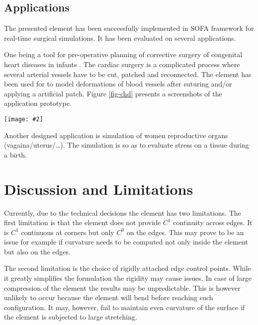 \documentclass{egpubl}
\newcommand{\FigureW}[3]{%
\begin{figure*}[htb]
  \centering
  \texttt{[image: \#2]}
  \caption{\label{fig-#2}#3}
\end{figure*}}
\begin{document}
\subsection{Applications}

The presented element has been successfully implemented in SOFA framework
\cite{Faure2012} for real-time surgical simulations. It has been evaluated
on several applications.

One being a tool for pre-operative planning of corrective surgery of
congenital heart diseases in infants \cite{Kislinskiy2012}. The cardiac
surgery is a complicated process where several arterial vessels have to be
cut, patched and reconnected. The element has been used for to model
deformations of blood vessels after suturing and/or applying a artificial
patch. Figure \ref{fig-chd} presents a screenshots of the application
prototype.

\FigureW{0.75\linewidth}{chd}
{Screenshots of the simulation system prototype for different surgical
procedures used to repair a coarctation of an aortic arch. The screenshots
are enriched with overlay delineations.}

Another designed application is simulation of women reproductive organs
(vagaina/uterus/\ldots). 
The simulation is so as to evaluate
stress on a tissue during a birth.



\section{Discussion and Limitations} %

Currently, due to the technical decisions the element has two limitations.
The first limitation is that the element does not provide $C^1$ continuity
across edges. It is $C^1$ continuous at corners but only $C^0$ on the
edges. This may prove to be an issue for example if curvature needs to be
computed not only inside the element but also on the edges.

The second limitation is the choice of rigidly attached edge control
points. While it greatly simplifies the formulation the rigidity may cause
issues. In case of large compression of the element the results may be
unpredictable. This is however unlikely to occur because the element will
bend before reaching such configuration. It may, however, fail to maintain
even curvature of the surface if the element is subjected to large
stretching.
\end{document}
